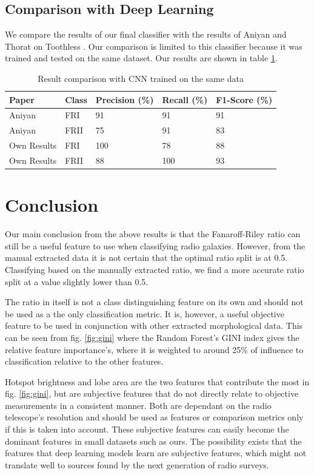 \documentclass[conference]{IEEEtran}
\begin{document}
\subsection{Comparison with Deep Learning}

We compare the results of our final classifier with the results of Aniyan and Thorat on Toothless \cite{aniyan_thorat_2017}. Our comparison is limited to this classifier because it was trained and tested on the same dataset. Our results are shown in table \ref{tab:results}.

\begin{table}[h]
  \caption{Result comparison with CNN trained on the same data}
  \label{tab:results}
  
\begin{tabular}{|l|l|l|l|l|}
\hline
Paper & Class & Precision (\%) & Recall (\%) & F1-Score (\%)  \\
 \hline
Aniyan \cite{aniyan_thorat_2017} & FRI & 91 & 91 & 91  \\
 \hline
Aniyan \cite{aniyan_thorat_2017} & FRII & 75 & 91 & 83   \\
 \hline
Own Results & FRI & 100 & 78 & 88 \\
 \hline
Own Results & FRII & 88 & 100 & 93 \\
 \hline
\end{tabular}
\end{table}

\section{Conclusion}

Our main conclusion from the above results is that the Fanaroff-Riley ratio can still be a useful feature to use when classifying radio galaxies. However, from the manual extracted data it is not certain that the optimal ratio split is at 0.5. Classifying based on the manually extracted ratio, we find a more accurate ratio split at a value slightly lower than 0.5.

The ratio in itself is not a class distinguishing feature on its own and should not be used as a the only classification metric. It is, however, a useful objective feature to be used in conjunction with other extracted morphological data. This can be seen from fig. \ref{fig:gini} where the Random Forest's GINI index gives the relative feature importance's, where it is weighted to around 25\% of influence to classification relative to the other features.

Hotspot brightness and lobe area are the two features that contribute the most in fig. \ref{fig:gini}, but are subjective features that do not directly relate to objective measurements in a consistent manner. Both are dependant on the radio telescope's resolution and should be used as features or comparison metrics only if this is taken into account. These subjective features can easily become the dominant features in small datasets such as ours. The possibility exists that the features that deep learning models learn are subjective features, which might not translate well to sources found by the next generation of radio surveys.
\end{document}
